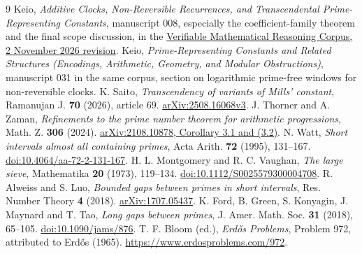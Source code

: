 \documentclass[11pt]{article}
\theoremstyle{remark}\newtheorem*{remark}{Remark}
\begin{document}
\begin{thebibliography}{9}
 Keio, \emph{Additive Clocks, Non-Reversible Recurrences, and
Transcendental Prime-Representing Constants}, manuscript 008, especially
the coefficient-family theorem and the final scope discussion, in the
\href{https://github.com/QEEDDD/Verifiable-Mathematical-Reasoning-Corpus/tree/ecd87de3348dcb706a76bb12fde722d7a348a012}{Verifiable Mathematical Reasoning Corpus, 2 November 2026 revision}.
 Keio, \emph{Prime-Representing Constants and Related Structures
(Encodings, Arithmetic, Geometry, and Modular Obstructions)}, manuscript
031 in the same corpus, section on logarithmic prime-free windows for
non-reversible clocks.
 K. Saito, \emph{Transcendency of variants of Mills' constant},
Ramanujan J. \textbf{70} (2026), article 69.
\href{https://arxiv.org/html/2508.16068v3}{arXiv:2508.16068v3}.
 J. Thorner and A. Zaman, \emph{Refinements to the prime number
theorem for arithmetic progressions}, Math. Z. \textbf{306} (2024).
\href{https://arxiv.org/pdf/2108.10878}{arXiv:2108.10878, Corollary 3.1 and (3.2)}.
 N. Watt, \emph{Short intervals almost all containing primes},
Acta Arith. \textbf{72} (1995), 131--167.
\href{https://doi.org/10.4064/aa-72-2-131-167}{doi:10.4064/aa-72-2-131-167}.
 H. L. Montgomery and R. C. Vaughan, \emph{The large sieve},
Mathematika \textbf{20} (1973), 119--134.
\href{https://doi.org/10.1112/S0025579300004708}{doi:10.1112/S0025579300004708}.
 R. Alweiss and S. Luo, \emph{Bounded gaps between primes in short
intervals}, Res. Number Theory \textbf{4} (2018).
\href{https://arxiv.org/abs/1707.05437}{arXiv:1707.05437}.
 K. Ford, B. Green, S. Konyagin, J. Maynard and T. Tao,
\emph{Long gaps between primes}, J. Amer. Math. Soc. \textbf{31} (2018),
65--105. \href{https://doi.org/10.1090/jams/876}{doi:10.1090/jams/876}.
 T. F. Bloom (ed.), \emph{Erd\H os Problems}, Problem 972,
attributed to Erd\H os (1965). \url{https://www.erdosproblems.com/972}.
\end{thebibliography}
\end{document}
